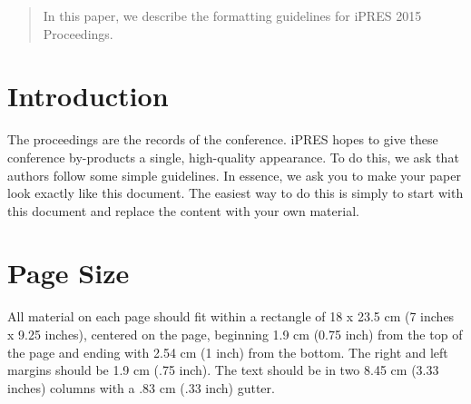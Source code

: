 \documentclass{ipres_proc_article-sp}
\begin{document}

\maketitle
\begin{abstract}
In this paper, we describe the formatting guidelines for iPRES 2015
Proceedings.
\end{abstract}



\section{Introduction}
The proceedings are the records of the conference. iPRES hopes to give
these conference by-products a single, high-quality appearance. To do
this, we ask that authors follow some simple guidelines. In essence,
we ask you to make your paper look exactly like this document. The
easiest way to do this is simply to start with this document and
replace the content with your own material.

\section{Page Size}
All material on each page should fit within a rectangle of 18 x 23.5 cm
(7 inches x 9.25 inches), centered on the page, beginning 1.9 cm (0.75 inch) from
the top of the page and ending with 2.54 cm (1 inch) from the bottom.
The right and left margins should be 1.9 cm (.75 inch).  The text should
be in two 8.45 cm (3.33 inches) columns with a .83 cm (.33 inch) gutter.
\end{document}
